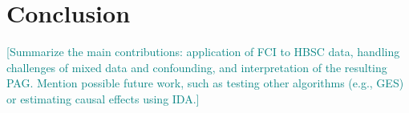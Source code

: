 \documentclass[main.tex]{subfiles}
\begin{document}
\section{Conclusion}


\textcolor{teal}{[Summarize the main contributions: application of FCI to HBSC data, handling challenges of mixed data and confounding, and interpretation of the resulting PAG. Mention possible future work, such as testing other algorithms (e.g., GES) or estimating causal effects using IDA.]}
\end{document}
